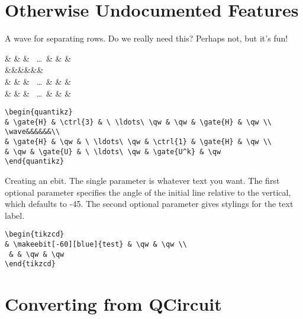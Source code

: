 \documentclass[aps,pra,10pt,nofootinbib]{revtex4}
\begin{document}
\section{Otherwise Undocumented Features}
A wave for separating rows. Do we really need this? Perhaps not, but it's fun!
\begin{Code}
\begin{center}
\begin{quantikz}
&  &  & \ \ldots\ \qw & \qw &  & \qw \\
\wave&&&&&&\\
&  & \qw & \ \ldots\ \qw &  &  & \qw \\
& \qw &  & \ \ldots\ \qw &  & \qw & \qw
\end{quantikz}
\end{center}
\tcblower
\begin{lstlisting}
\begin{quantikz}
& \gate{H} & \ctrl{3} & \ \ldots\ \qw & \qw & \gate{H} & \qw \\
\wave&&&&&&\\
& \gate{H} & \qw & \ \ldots\ \qw & \ctrl{1} & \gate{H} & \qw \\
& \qw & \gate{U} & \ \ldots\ \qw & \gate{U^k} & \qw
\end{quantikz}
\end{lstlisting}
\end{Code}


Creating an ebit. The single parameter is whatever text you want. The first optional parameter specifies the angle of the initial line relative to the vertical, which defaults to -45. The second optional parameter gives stylings for the text label.
\begin{Code}
\begin{center}
\end{center}
\tcblower
\begin{lstlisting}
\begin{tikzcd}
& \makeebit[-60][blue]{test} & \qw & \qw \\
 & & \qw & \qw
\end{tikzcd}
\end{lstlisting}
\end{Code}

\section{Converting from QCircuit}
\end{document}
